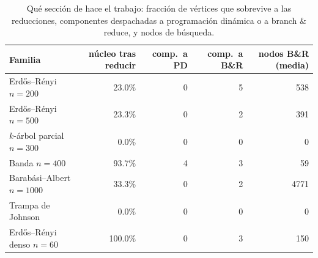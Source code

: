 \begin{table}[!htbp]\centering\small
\begin{tabular}{@{}lrrrr@{}}\toprule
Familia & núcleo tras reducir & comp.\ a PD & comp.\ a B\&R & nodos B\&R (media) \\\midrule
Erdős–Rényi $n{=}200$ & 23.0\% & 0 & 5 & 538 \\
Erdős–Rényi $n{=}500$ & 23.3\% & 0 & 2 & 391 \\
$k$-árbol parcial $n{=}300$ & 0.0\% & 0 & 0 & 0 \\
Banda $n{=}400$ & 93.7\% & 4 & 3 & 59 \\
Barabási–Albert $n{=}1000$ & 33.3\% & 0 & 2 & 4771 \\
Trampa de Johnson & 0.0\% & 0 & 0 & 0 \\
Erdős–Rényi denso $n{=}60$ & 100.0\% & 0 & 3 & 150 \\
\bottomrule\end{tabular}
\caption{Qué sección de \hyvc{} hace el trabajo: fracción de vértices que sobrevive a las reducciones, componentes despachadas a programación dinámica o a branch \& reduce, y nodos de búsqueda.}\label{tab:hyvc}\end{table}

